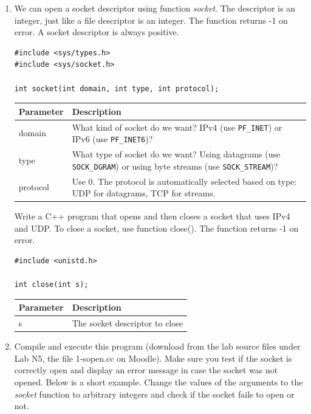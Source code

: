 \documentclass[12pt]{book}
\begin{document}
\begin{enumerate}[resume*]
\item We can open a socket descriptor using function \emph{socket}. The descriptor is an integer, just like a file descriptor is an integer. The function returns -1 on error. A socket descriptor is always positive.

  \begin{lstlisting}
#include <sys/types.h>
#include <sys/socket.h>

int socket(int domain, int type, int protocol);
  \end{lstlisting}

  \begin{tabular}{l p{10cm}}
    \toprule
    Parameter & Description \\
    \midrule
    domain & What kind of socket do we want? IPv4 (use \verb$PF_INET$) or IPv6 (use \verb$PF_INET6$)? \\
    type & What type of socket do we want? Using datagrams (use \verb$SOCK_DGRAM$) or using byte streams (use \verb$SOCK_STREAM$)? \\
    protocol & Use $0$. The protocol is automatically selected based on type: UDP for datagrams, TCP for streams.\\
    \bottomrule
  \end{tabular}

Write a C++ program that opens and then closes a socket that uses IPv4 and UDP. To close a socket, use function close(). The function returns -1 on error.

\begin{lstlisting}
#include <unistd.h>

int close(int s);
\end{lstlisting}

\begin{tabular}{l p{10cm}}
    \toprule
    Parameter & Description \\
    \midrule
    s & The socket descriptor to close\\
    \bottomrule
\end{tabular}


\item Compile and execute this program (download from the lab source files under Lab N5, the file 1-sopen.cc on Moodle). Make sure you test if the socket is correctly open and display an error message in case the socket was not opened. Below is a short example. Change the values of the arguments to the \emph{socket} function to arbitrary integers and check if the socket fails to open or not.


\end{enumerate}
\end{document}
